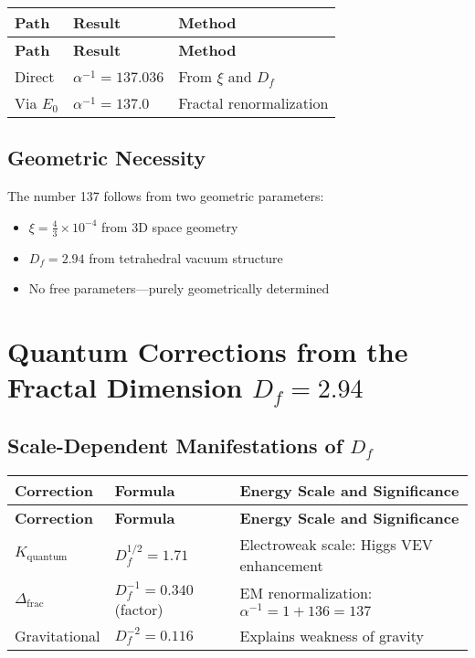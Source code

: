 \documentclass[12pt,a4paper]{article}
\begin{document}
	\begin{longtable}{|p{3cm}|p{3cm}|p{5cm}|}
		\hline
		\textbf{Path} & \textbf{Result} & \textbf{Method} \\
		\hline
		\endfirsthead
		\hline
		\textbf{Path} & \textbf{Result} & \textbf{Method} \\
		\hline
		\endhead
		Direct & \(\alpha^{-1} = 137.036\) & From \(\xi\) and \(D_f\) \\
		\hline
		Via \(E_0\) & \(\alpha^{-1} = 137.0\) & Fractal renormalization \\
		\hline
	\end{longtable}
	
	\subsection{Geometric Necessity}
	
	The number 137 follows from two geometric parameters:
	\begin{itemize}
		\item \(\xi = \frac{4}{3} \times 10^{-4}\) from 3D space geometry
		\item \(D_f = 2.94\) from tetrahedral vacuum structure
		\item No free parameters—purely geometrically determined
	\end{itemize}
	
	\section{Quantum Corrections from the Fractal Dimension \(D_f = 2.94\)}
	
	\subsection{Scale-Dependent Manifestations of \(D_f\)}
	
	\begin{longtable}{|p{4cm}|p{3cm}|p{6cm}|}
		\hline
		\textbf{Correction} & \textbf{Formula} & \textbf{Energy Scale and Significance} \\
		\hline
		\endfirsthead
		\hline
		\textbf{Correction} & \textbf{Formula} & \textbf{Energy Scale and Significance} \\
		\hline
		\endhead
		\(K_{\text{quantum}}\) & \(D_f^{1/2} = 1.71\) & Electroweak scale: Higgs VEV enhancement \\
		\hline
		\(\Delta_{\text{frac}}\) & \(D_f^{-1} = 0.340\) (factor) & EM renormalization: \(\alpha^{-1} = 1 + 136 = 137\) \\
		\hline
		Gravitational & \(D_f^{-2} = 0.116\) & Explains weakness of gravity \\
		\hline
	\end{longtable}
	
\end{document}
